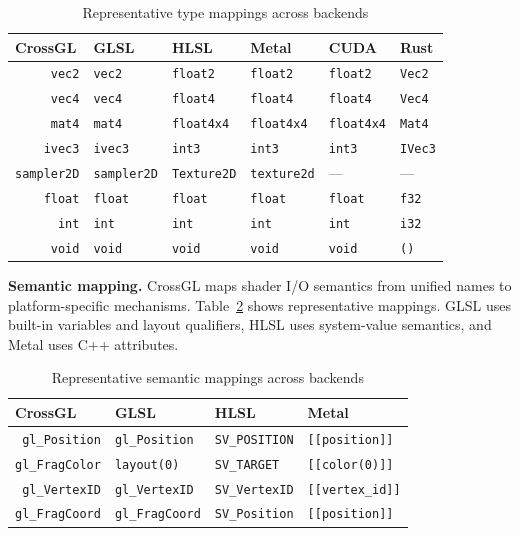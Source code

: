 \documentclass{svproc}
\begin{document}
\begin{table}[H]
\caption{Representative type mappings across backends}
\label{tab:typemap}
\begin{center}
\begin{tabular}{r@{\quad}lllll}
\hline
\multicolumn{1}{l}{\rule{0pt}{12pt}\textbf{CrossGL}} & \textbf{GLSL} & \textbf{HLSL} & \textbf{Metal} & \textbf{CUDA} & \textbf{Rust} \\[2pt]
\hline\rule{0pt}{12pt}
\texttt{vec2} & \texttt{vec2} & \texttt{float2} & \texttt{float2} & \texttt{float2} & \texttt{Vec2} \\
\texttt{vec4} & \texttt{vec4} & \texttt{float4} & \texttt{float4} & \texttt{float4} & \texttt{Vec4} \\
\texttt{mat4} & \texttt{mat4} & \texttt{float4x4} & \texttt{float4x4} & \texttt{float4x4} & \texttt{Mat4} \\
\texttt{ivec3} & \texttt{ivec3} & \texttt{int3} & \texttt{int3} & \texttt{int3} & \texttt{IVec3} \\
\texttt{sampler2D} & \texttt{sampler2D} & \texttt{Texture2D} & \texttt{texture2d} & --- & --- \\
\texttt{float} & \texttt{float} & \texttt{float} & \texttt{float} & \texttt{float} & \texttt{f32} \\
\texttt{int} & \texttt{int} & \texttt{int} & \texttt{int} & \texttt{int} & \texttt{i32} \\
\texttt{void} & \texttt{void} & \texttt{void} & \texttt{void} & \texttt{void} & \texttt{()} \\[2pt]
\hline
\end{tabular}
\end{center}
\end{table}

\textbf{Semantic mapping.} CrossGL maps shader I/O semantics from unified names to platform-specific mechanisms. Table~\ref{tab:semanticmap} shows representative mappings. GLSL uses built-in variables and layout qualifiers, HLSL uses system-value semantics, and Metal uses C++ attributes.

\begin{table}[H]
\caption{Representative semantic mappings across backends}
\label{tab:semanticmap}
\begin{center}
\begin{tabular}{r@{\quad}lll}
\hline
\multicolumn{1}{l}{\rule{0pt}{12pt}\textbf{CrossGL}} & \textbf{GLSL} & \textbf{HLSL} & \textbf{Metal} \\[2pt]
\hline\rule{0pt}{12pt}
\texttt{gl\_Position} & \texttt{gl\_Position} & \texttt{SV\_POSITION} & \texttt{[[position]]} \\
\texttt{gl\_FragColor} & \texttt{layout(0)} & \texttt{SV\_TARGET} & \texttt{[[color(0)]]} \\
\texttt{gl\_VertexID} & \texttt{gl\_VertexID} & \texttt{SV\_VertexID} & \texttt{[[vertex\_id]]} \\
\texttt{gl\_FragCoord} & \texttt{gl\_FragCoord} & \texttt{SV\_Position} & \texttt{[[position]]} \\[2pt]
\hline
\end{tabular}
\end{center}
\end{table}
\end{document}
